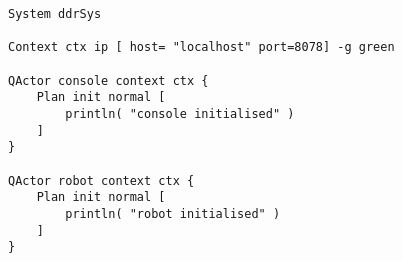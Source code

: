 \begin{lstlisting}
System ddrSys

Context ctx ip [ host= "localhost" port=8078] -g green 

QActor console context ctx {
	Plan init normal [
		println( "console initialised" ) 
	] 
}

QActor robot context ctx {
	Plan init normal [
		println( "robot initialised" ) 
	] 
}

\end{lstlisting}